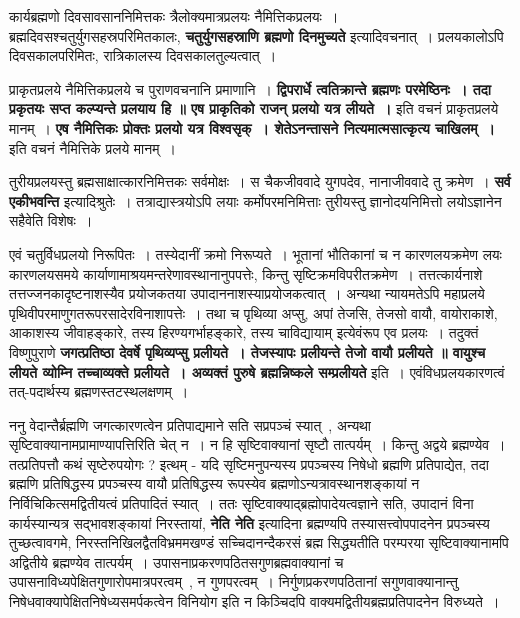 	कार्यब्रह्मणो दिवसावसाननिमित्तकः त्रैलोक्यमात्रप्रलयः नैमित्तिकप्रलयः~। ब्रह्मदिवसश्चतुर्युगसहस्रपरिमितकालः, {\bfseries चतुर्युगसहस्राणि ब्रह्मणो दिनमुच्यते} इत्यादिवचनात्~। प्रलयकालोऽपि दिवसकालपरिमितः, रात्रिकालस्य दिवसकालतुल्यत्वात्~।\par
	प्राकृतप्रलये नैमित्तिकप्रलये च पुराणवचनानि प्रमाणानि~। {\bfseries द्विपरार्धे त्वतिक्रान्ते ब्रह्मणः परमेष्ठिनः~। तदा प्रकृतयः सप्त कल्प्यन्ते प्रलयाय हि ॥ एष प्राकृतिको राजन् प्रलयो यत्र लीयते~।} इति वचनं प्राकृतप्रलये मानम्~। {\bfseries एष नैमित्तिकः प्रोक्तः प्रलयो यत्र विश्वसृक्~। शेतेऽनन्तासने नित्यमात्मसात्कृत्य चाखिलम्~।} इति वचनं नैमित्तिके प्रलये मानम्~।\par
	तुरीयप्रलयस्तु ब्रह्मसाक्षात्कारनिमित्तकः सर्वमोक्षः~। स चैकजीववादे युगपदेव, नानाजीववादे तु क्रमेण~। {\bfseries सर्व एकीभवन्ति} इत्यादिश्रुतेः~। तत्राद्यास्त्रयोऽपि लयाः कर्मोपरमनिमित्ताः तुरीयस्तु ज्ञानोदयनिमित्तो लयोऽज्ञानेन सहैवेति विशेषः~।\par
	एवं चतुर्विधप्रलयो निरूपितः~। तस्येदानीं क्रमो निरूप्यते~। भूतानां भौतिकानां च न कारणलयक्रमेण लयः कारणलयसमये कार्याणामाश्रयमन्तरेणावस्थानानुपपत्तेः, किन्तु सृष्टिक्रमविपरीतक्रमेण~। तत्तत्कार्यनाशे तत्तज्जनकादृष्टनाशस्यैव प्रयोजकतया उपादाननाशस्याप्रयोजकत्वात्~। अन्यथा न्यायमतेऽपि महाप्रलये पृथिवीपरमाणुगतरूपरसादेरविनाशापत्तेः~। तथा च पृथिव्या अप्सु, अपां तेजसि, तेजसो वायौ, वायोराकाशे, आकाशस्य जीवाहङ्कारे, तस्य हिरण्यगर्भाहङ्कारे, तस्य चाविद्यायाम् इत्येवंरूप एव प्रलयः~। तदुक्तं विष्णुपुराणे {\bfseries जगत्प्रतिष्ठा देवर्षे पृथिव्यप्सु प्रलीयते~। तेजस्यापः प्रलीयन्ते तेजो वायौ प्रलीयते ॥ वायुश्च लीयते व्योम्नि तच्चाव्यक्ते प्रलीयते~। अव्यक्तं पुरुषे ब्रह्मन्निष्कले सम्प्रलीयते} इति~। एवंविधप्रलयकारणत्वं तत्-पदार्थस्य ब्रह्मणस्तटस्थलक्षणम्~।\par
	ननु वेदान्तैर्ब्रह्मणि जगत्कारणत्वेन प्रतिपाद्यमाने सति सप्रपञ्चं स्यात्~, अन्यथा सृष्टिवाक्यानामप्रामाण्यापत्तिरिति चेत् न~। न हि सृष्टिवाक्यानां सृष्टौ तात्पर्यम्~। किन्तु अद्वये ब्रह्मण्येव~। तत्प्रतिपत्तौ कथं सृष्टेरुपयोगः ? इत्थम् - यदि सृष्टिमनुपन्यस्य प्रपञ्चस्य निषेधो ब्रह्मणि प्रतिपाद्येत, तदा ब्रह्मणि प्रतिषिद्धस्य प्रपञ्चस्य वायौ प्रतिषिद्धस्य रूपस्येव ब्रह्मणोऽन्यत्रावस्थानशङ्कायां न निर्विचिकित्समद्वितीयत्वं प्रतिपादितं स्यात्~। ततः सृष्टिवाक्याद्ब्रह्मोपादेयत्वज्ञाने सति, उपादानं विना कार्यस्यान्यत्र सद्भावशङ्कायां निरस्तायां, {\bfseries नेति नेति} इत्यादिना ब्रह्मण्यपि तस्यासत्त्वोपपादनेन प्रपञ्चस्य तुच्छत्वावगमे, निरस्तनिखिलद्वैतविभ्रममखण्डं सच्चिदानन्दैकरसं ब्रह्म सिद्ध्यतीति परम्परया सृष्टिवाक्यानामपि अद्वितीये ब्रह्मण्येव तात्पर्यम्~। उपासनाप्रकरणपठितसगुणब्रह्मवाक्यानां च उपासनाविध्यपेक्षितगुणारोपमात्रपरत्वम्~, न गुणपरत्वम्~। निर्गुणप्रकरणपठितानां सगुणवाक्यानान्तु निषेधवाक्यापेक्षितनिषेध्यसमर्पकत्वेन विनियोग इति न किञ्चिदपि वाक्यमद्वितीयब्रह्मप्रतिपादनेन विरुध्यते~।\par
